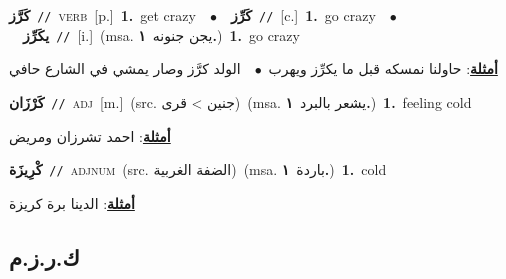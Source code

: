 \documentclass[10pt,a4paper,twoside]{article} %
\begin{document}
\begin{multicols}{2}
{\setlength\topsep{0pt}\textbf{\foreignlanguage{arabic}{كَرَّز}}\ {\color{gray}\texttt{//}\color{black}}\ \textsc{verb}\ [p.]\ \textbf{1.}~get crazy\ \ $\bullet$\ \ \setlength\topsep{0pt}\textbf{\foreignlanguage{arabic}{كَرِّز}}\ {\color{gray}\texttt{//}\color{black}}\ [c.]\ \textbf{1.}~go crazy\ \ $\bullet$\ \ \setlength\topsep{0pt}\textbf{\foreignlanguage{arabic}{يكَرِّز}}\ {\color{gray}\texttt{//}\color{black}}\ [i.]\ \color{gray}(msa. \foreignlanguage{arabic}{يجن جنونه}~\foreignlanguage{arabic}{\textbf{١.}})\color{black}\ \textbf{1.}~go crazy\  \begin{flushright}\color{gray}\foreignlanguage{arabic}{\textbf{\underline{\foreignlanguage{arabic}{أمثلة}}}: حاولنا نمسكه قبل ما يكرِّز ويهرب\ $\bullet$\ \  الولد كرَّز وصار يمشي في الشارع حافي}\end{flushright}\color{black}} \vspace{2mm}

{\setlength\topsep{0pt}\textbf{\foreignlanguage{arabic}{كَرْزَان}}\ {\color{gray}\texttt{//}\color{black}}\ \textsc{adj}\ [m.]\ (src. \color{gray}\foreignlanguage{arabic}{جنين > قرى}\color{black})\ \color{gray}(msa. \foreignlanguage{arabic}{يشعر بالبرد}~\foreignlanguage{arabic}{\textbf{١.}})\color{black}\ \textbf{1.}~feeling cold\  \begin{flushright}\color{gray}\foreignlanguage{arabic}{\textbf{\underline{\foreignlanguage{arabic}{أمثلة}}}: احمد تشرزان ومريض}\end{flushright}\color{black}} \vspace{2mm}

{\setlength\topsep{0pt}\textbf{\foreignlanguage{arabic}{كْرِيزَة}}\ {\color{gray}\texttt{//}\color{black}}\ \textsc{adj\textunderscore num}\ (src. \color{gray}\foreignlanguage{arabic}{الضفة الغربية}\color{black})\ \color{gray}(msa. \foreignlanguage{arabic}{باردة}~\foreignlanguage{arabic}{\textbf{١.}})\color{black}\ \textbf{1.}~cold\  \begin{flushright}\color{gray}\foreignlanguage{arabic}{\textbf{\underline{\foreignlanguage{arabic}{أمثلة}}}: الدينا برة كريزة}\end{flushright}\color{black}} \vspace{2mm}

\vspace{-3mm}
\subsection*{\color{blue}\foreignlanguage{arabic}{ك.ر.ز.م}\color{blue}{}} 


\end{multicols}
\end{document}
